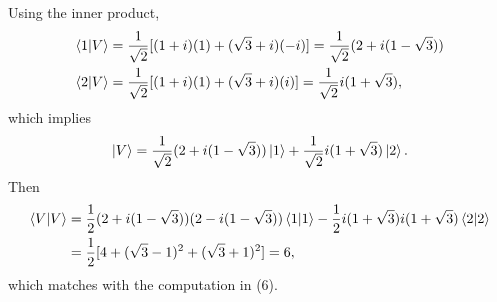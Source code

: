 \documentclass[11pt]{article}
\begin{document}
\begin{enumerate}[label=24.\arabic*]
    Using the inner product, \begin{align*}
        \bra{1}\ket{V} &= \frac{1}{\sqrt{2}}[(1+i)(1) + (\sqrt{3}+ i )(-i)] = \frac{1}{\sqrt{2}}(2 + i(1-\sqrt{3}))\\
        \bra{2}\ket{V} &= \frac{1}{\sqrt{2}}[(1+i)(1) + (\sqrt{3}+ i )(i)] = \frac{1}{\sqrt{2}}i(1+\sqrt{3}),
    \end{align*} which implies \[\ket{V} = \frac{1}{\sqrt{2}}(2 + i(1-\sqrt{3}))\ket{1} +\frac{1}{\sqrt{2}}i(1+\sqrt{3})\ket{2} .\] Then \begin{align*}
        \bra{V}\ket{V} &= \frac{1}{2}(2 + i(1-\sqrt{3}))(2 - i(1-\sqrt{3}))\bra{1}\ket{1} - \frac{1}{2}i(1+\sqrt{3})i(1+\sqrt{3})\bra{2}\ket{2}\\
        &= \frac{1}{2}[4 + (\sqrt{3}-1)^2 + (\sqrt{3}+1)^2] = 6,
    \end{align*} which matches with the computation in (6).
\end{enumerate}
\end{document}

